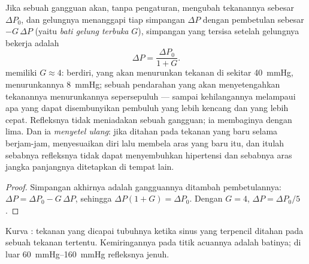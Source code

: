 \begin{theorem}\label{thm:b2:blood-pressure:gain}
Jika sebuah gangguan akan, tanpa pengaturan, mengubah tekanannya
sebesar $\Delta P_0$, dan gelungnya menanggapi tiap simpangan $\Delta P$ dengan pembetulan sebesar $-G\,\Delta P$ (yaitu \emph{bati gelung
terbuka} $G$), simpangan yang tersisa setelah gelungnya bekerja adalah
\[
\Delta P = \frac{\Delta P_0}{1 + G}.
\]
 memiliki $G \approx 4$: berdiri, yang akan menurunkan
tekanan di  sekitar \qty{40}{mmHg}, menurunkannya
\qty{8}{mmHg}; sebuah pendarahan yang akan menyetengahkan tekanannya
menurunkannya sepersepuluh --- sampai kehilangannya melampaui apa yang
dapat disembunyikan pembuluh yang lebih kencang dan  yang lebih
cepat. Refleksnya tidak meniadakan sebuah gangguan; ia membaginya
dengan lima. Dan ia \emph{menyetel ulang}: jika ditahan pada tekanan
yang baru selama berjam-jam,  menyesuaikan diri lalu
membela aras yang baru itu, dan itulah sebabnya refleksnya tidak dapat
menyembuhkan hipertensi dan sebabnya aras jangka panjangnya ditetapkan
di tempat lain.
\end{theorem}
\begin{proof}
Simpangan akhirnya adalah gangguannya ditambah pembetulannya:
$\Delta P = \Delta P_0 - G\,\Delta P$, sehingga $\Delta P(1 + G) =
\Delta P_0$. Dengan $G = 4$, $\Delta P = \Delta P_0/5$.
\end{proof}

\begin{omfigure}

{\small Kurva : tekanan yang dicapai tubuhnya ketika
sinus yang terpencil ditahan pada sebuah tekanan tertentu.
Kemiringannya pada titik acuannya adalah batinya; di luar
\qtyrange{60}{160}{mmHg} refleksnya jenuh.}
\end{omfigure}

